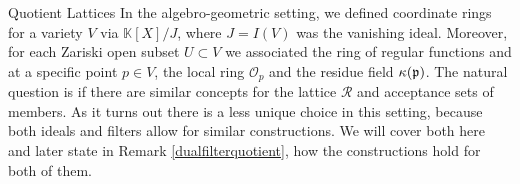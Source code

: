 \begin{subsection}{Quotient Lattices} \label{quotientlatticesect}
    In the algebro-geometric setting, we defined coordinate rings for a variety  \( V \)
    via \( \mathbb{K}[X]/J \), where \( J = I(V) \) was the vanishing ideal.
    Moreover, for each Zariski open subset \( U \subset V \) we associated
    the ring of regular functions and at a specific point \( p \in V \), the 
    local ring \( \mathcal{O}_{p} \) and the residue field \( \kappa(\mathfrak{p}) \).
    The natural question is if there are similar concepts for the lattice \( \mathcal{R} \)
    and acceptance sets of members. As it turns out there is a less unique choice 
    in this setting, because both ideals and filters allow for similar constructions. 
    We will cover both here and later state in Remark \ref{dualfilterquotient}, how the constructions 
    hold for both of them.


\end{subsection}
